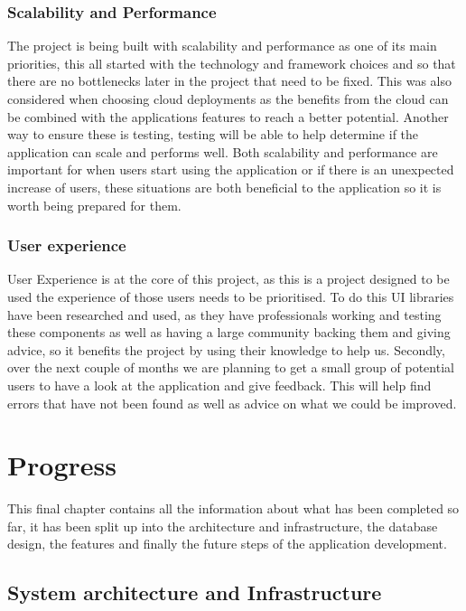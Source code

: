 \documentclass[]{project_report}
\begin{document}
\subsection{Scalability and Performance}

The project is being built with scalability and performance as one of its main priorities, this all started with the technology and framework choices and so that there are no bottlenecks later in the project that need to be fixed. This was also considered when choosing cloud deployments as the benefits from the cloud can be combined with the applications features to reach a better potential. Another way to ensure these is testing, testing will be able to help determine if the application can scale and performs well. Both scalability and performance are important for when users start using the application or if there is an unexpected increase of users, these situations are both beneficial to the application so it is worth being prepared for them.

\subsection{User experience}

User Experience is at the core of this project, as this is a project designed to be used the experience of those users needs to be prioritised. To do this UI libraries have been researched and used, as they have professionals working and testing these components as well as having a large community backing them and giving advice, so it benefits the project by using their knowledge to help us. Secondly, over the next couple of months we are planning to get a small group of potential users to have a look at the application and give feedback. This will help find errors that have not been found as well as advice on what we could be improved. 


\chapter{Progress}

This final chapter contains all the information about what has been completed so far, it has been split up into the architecture and infrastructure, the database design, the features and finally the future steps of the application development. 

\section{System architecture and Infrastructure}
\end{document}
